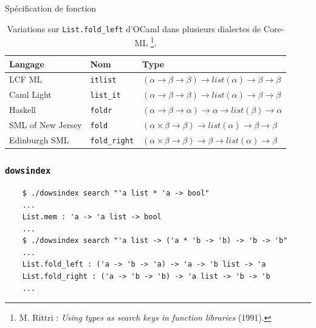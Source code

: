 \documentclass[serif]{beamer}
\newcommand{\dowsindex}{\texttt{dowsindex}\xspace}
\begin{document}
\begin{frame}{Spécification de fonction}
\footnotesize
\begin{table}[h]
 	\centering
 	\begin{tabular}{|l|l|l|}
	 	\hline
	 		Langage &
			Nom &
			Type
		\\
		\hline
			LCF ML &
			\texttt{itlist} &
			$(\alpha \rightarrow \beta \rightarrow \beta) \rightarrow list (\alpha) \rightarrow \beta \rightarrow \beta$
		\\
			Caml Light &
			\texttt{list\_it} &
			$(\alpha \rightarrow \beta \rightarrow \beta) \rightarrow list (\alpha) \rightarrow \beta \rightarrow \beta$
		\\
			Haskell &
			\texttt{foldr} &
			$(\alpha \rightarrow \beta \rightarrow \alpha) \rightarrow \alpha \rightarrow list (\beta) \rightarrow \alpha$
		\\
			SML of New Jersey &
			\texttt{fold} &
			$(\alpha \times \beta \rightarrow \beta) \rightarrow list (\alpha) \rightarrow \beta \rightarrow \beta$
		\\
			Edinburgh SML &
			\texttt{fold\_right} &
			$(\alpha \times \beta \rightarrow \beta) \rightarrow \beta \rightarrow list (\alpha) \rightarrow \beta$
		\\
		\hline
	\end{tabular}
	\caption*{Variations sur \texttt{List.fold\_left} d'OCaml dans plusieurs dialectes de Core-ML \footnote{M. Rittri : \textit{Using types as search keys in function libraries} (1991).}.}
\end{table}
\end{frame}


\begin{frame}[fragile=singleslide]\frametitle{\dowsindex}
\footnotesize
\begin{verbatim}
	$ ./dowsindex search "'a list * 'a -> bool"
	...
	List.mem : 'a -> 'a list -> bool
	...
	$ ./dowsindex search "'a list -> ('a * 'b -> 'b) -> 'b -> 'b"
	...
	List.fold_left : ('a -> 'b -> 'a) -> 'a -> 'b list -> 'a
	List.fold_right : ('a -> 'b -> 'b) -> 'a list -> 'b -> 'b
	...
\end{verbatim}
\end{frame}

\end{document}
